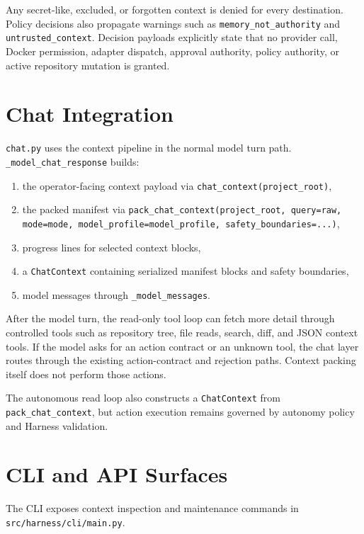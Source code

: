 \documentclass[11pt]{article}
\begin{document}
Any secret-like, excluded, or forgotten context is denied for every destination. Policy decisions also propagate warnings such as \texttt{memory\_not\_authority} and \texttt{untrusted\_context}. Decision payloads explicitly state that no provider call, Docker permission, adapter dispatch, approval authority, policy authority, or active repository mutation is granted.

\section{Chat Integration}

\texttt{chat.py} uses the context pipeline in the normal model turn path. \texttt{\_model\_chat\_response} builds:

\begin{enumerate}[leftmargin=*]
  \item the operator-facing context payload via \texttt{chat\_context(project\_root)},
  \item the packed manifest via \texttt{pack\_chat\_context(project\_root, query=raw, mode=mode, model\_profile=model\_profile, safety\_boundaries=...)},
  \item progress lines for selected context blocks,
  \item a \texttt{ChatContext} containing serialized manifest blocks and safety boundaries,
  \item model messages through \texttt{\_model\_messages}.
\end{enumerate}

After the model turn, the read-only tool loop can fetch more detail through controlled tools such as repository tree, file reads, search, diff, and JSON context tools. If the model asks for an action contract or an unknown tool, the chat layer routes through the existing action-contract and rejection paths. Context packing itself does not perform those actions.

The autonomous read loop also constructs a \texttt{ChatContext} from \texttt{pack\_chat\_context}, but action execution remains governed by autonomy policy and Harness validation.

\section{CLI and API Surfaces}

The CLI exposes context inspection and maintenance commands in \texttt{src/harness/cli/main.py}.
\end{document}

